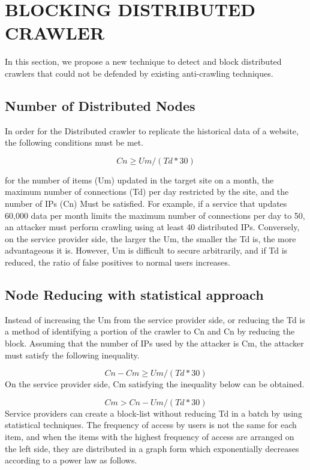 \documentclass[sigconf,anonymous=false]{acmart}
\begin{document}
%
%
\section{BLOCKING DISTRIBUTED CRAWLER}
In this section, we propose a new technique to detect and block distributed crawlers that could not be defended by existing anti-crawling techniques.

\subsection{Number of Distributed Nodes}
In order for the Distributed crawler to replicate the historical data of a website, the following conditions must be met. 

  \begin{displaymath}
Cn \geq Um / (Td * 30) 
  \end{displaymath}


for the number of items (Um) updated in the target site on a month, the maximum number of connections (Td) per day restricted by the site, and the number of IPs (Cn) Must be satisfied.
For example, if a service that updates 60,000 data per month limits the maximum number of connections per day to 50, an attacker must perform crawling using at least 40 distributed IPs. Conversely, on the service provider side, the larger the Um, the smaller the Td is, the more advantageous it is. However, Um is difficult to secure arbitrarily, and if Td is reduced, the ratio of false positives to normal users increases.


\subsection{Node Reducing with statistical approach}
Instead of increasing the Um from the service provider side, or reducing the Td is a method of identifying a portion of the crawler to Cn and Cn by reducing the block.
Assuming that the number of IPs used by the attacker is Cm, the attacker must satisfy the following inequality.

  \begin{displaymath}
Cn - Cm \geq Um / (Td * 30)
  \end{displaymath}\newline
On the service provider side, Cm satisfying the inequality below can be obtained.

  \begin{displaymath}
Cm > Cn - Um / (Td * 30)
  \end{displaymath}\newline
Service providers can create a block-list without reducing Td in a batch by using statistical techniques. The frequency of access by users is not the same for each item, and when the items with the highest frequency of access are arranged on the left side, they are distributed in a graph form which exponentially decreases according to a power law as follows.
\end{document}
